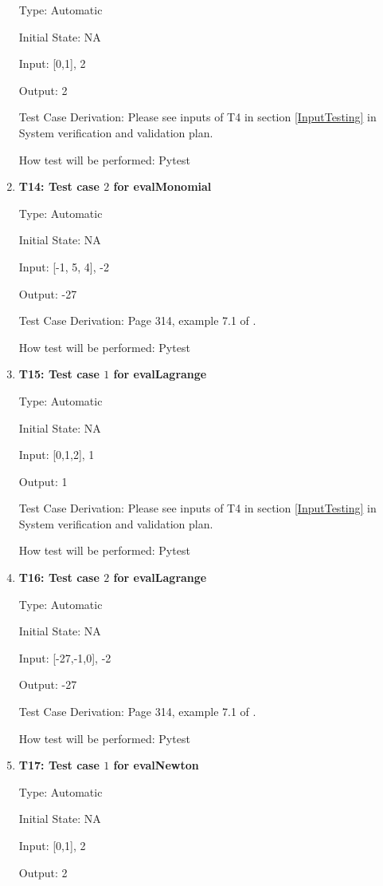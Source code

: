 \documentclass[12pt, titlepage]{article}
\begin{document}
\begin{enumerate}
Type: Automatic

Initial State: NA 

Input: [0,1], 2 

Output: 2

Test Case Derivation: Please see inputs of T4 in section \ref{InputTesting} in 
System verification and validation plan. 

How test will be performed: Pytest



\item{\textbf{T14: Test case $2$ for evalMonomial}}

Type: Automatic

Initial State: NA 

Input: [-1, 5, 4], -2 

Output: -27

Test Case Derivation: Page 314, example 7.1 of \cite{Health1997}. 

How test will be performed: Pytest



\item{\textbf{T15: Test case $1$ for evalLagrange}}

Type: Automatic

Initial State: NA 

Input: [0,1,2], 1 

Output: 1

Test Case Derivation: Please see inputs of T4 in section \ref{InputTesting} in 
System verification and validation plan.

How test will be performed: Pytest

\item{\textbf{T16: Test case $2$ for evalLagrange}}

Type: Automatic

Initial State: NA 

Input: [-27,-1,0], -2 

Output: -27

Test Case Derivation: Page 314, example 7.1 of \cite{Health1997}. 

How test will be performed: Pytest

\item{\textbf{T17: Test case $1$ for evalNewton}}

Type: Automatic

Initial State: NA 

Input: [0,1], 2 

Output: 2


\end{enumerate}
\end{document}
